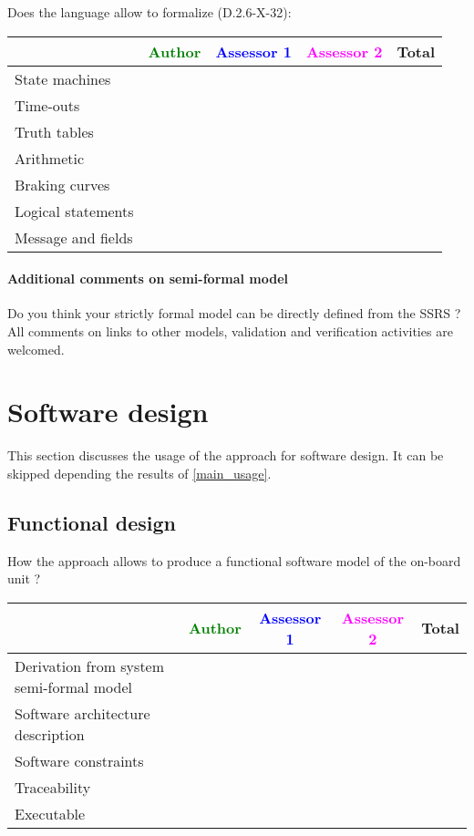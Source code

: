 Does the language allow to  formalize (D.2.6-X-32):

\begin{tabular}{|l | c | c | c | c|}
\hline
& \textcolor{green}{Author} & \textcolor{blue}{Assessor 1} & \textcolor{magenta}{Assessor 2} & Total \\
\hline 
State machines  & & & &  \\
\hline
Time-outs  & & & &  \\
\hline
Truth tables  & & & &  \\
\hline
Arithmetic  & & & &  \\
\hline
Braking curves  & & & &  \\
\hline
Logical statements & & & &  \\
\hline
Message and fields & & & &  \\
\hline
\end{tabular}

\paragraph{Additional comments on semi-formal  model} Do you think your strictly formal  model can be directly defined from the SSRS ?
All comments on links to  other models, validation and verification activities are welcomed.


\section{Software design}
This section discusses the usage of the approach for software design.
It can be skipped depending the results of \ref{main_usage}.

\subsection{Functional design}

How the approach allows to  produce a functional software model of the on-board unit ?

\begin{tabular}{|l | c | c | c | c|}
\hline
& \textcolor{green}{Author} & \textcolor{blue}{Assessor 1} & \textcolor{magenta}{Assessor 2} & Total \\
\hline
Derivation from system semi-formal model  & & & &  \\
\hline 
Software architecture description  & & & &  \\
\hline
Software constraints  & & & &  \\
\hline
Traceability  & & & &  \\
\hline
Executable  & & & &  \\
\hline
\end{tabular}

